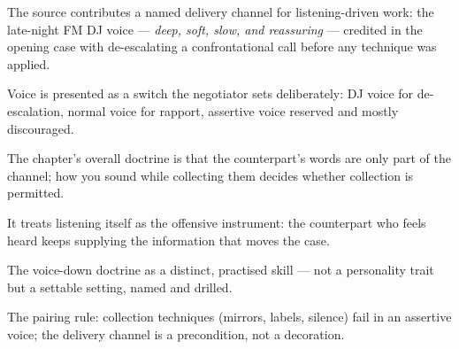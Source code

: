 

\begin{distilled}
  \item The source contributes a named delivery channel for listening-driven work: the late-night FM DJ voice --- \emph{deep, soft, slow, and reassuring} --- credited in the opening case with de-escalating a confrontational call before any technique was applied.
  \item Voice is presented as a switch the negotiator sets deliberately: DJ voice for de-escalation, normal voice for rapport, assertive voice reserved and mostly discouraged.
  \item The chapter's overall doctrine is that the counterpart's words are only part of the channel; how you sound while collecting them decides whether collection is permitted.
  \item It treats listening itself as the offensive instrument: the counterpart who feels heard keeps supplying the information that moves the case.
\end{distilled}

\begin{unique}
  \item The voice-down doctrine as a distinct, practised skill --- not a personality trait but a settable setting, named and drilled.
  \item The pairing rule: collection techniques (mirrors, labels, silence) fail in an assertive voice; the delivery channel is a precondition, not a decoration.
\end{unique}
